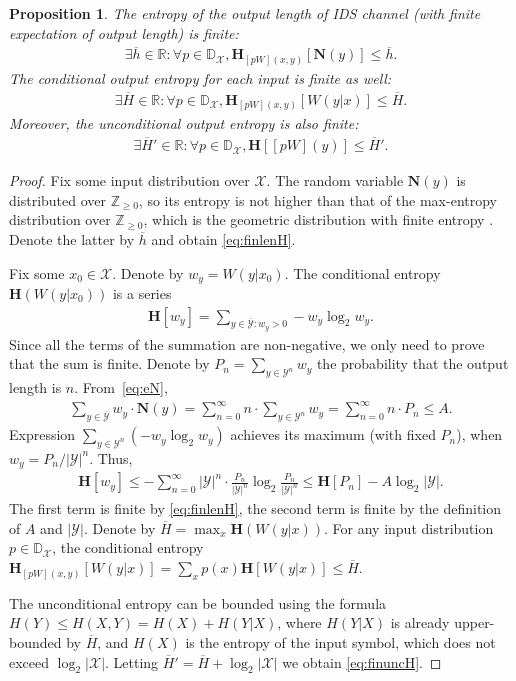 \documentclass[journal, twocol]{IEEEtran}
\newcommand{\oh}{{\overline{h}}}
\newcommand{\bD}{{\mathbb{D}}}
\newcommand{\oH}{{\overline{H}}}
\newcommand{\bfH}{{\mathbf{H}}}
\newcommand{\bfN}{{\mathbf{N}}}
\newcommand{\bR}{{\mathbb{R}}}
\newcommand{\mX}{{\mathcal{X}}}
\newcommand{\mY}{{\mathcal{Y}}}
\newcommand{\omY}{{\overline{\mathcal{Y}}}}
\newcommand{\bZ}{{\mathbb{Z}}}
\newcommand{\brsq}[1]{{\left[{#1}\right]}}
\newtheorem{proposition}{Proposition}
\newcommand{\pW}[2]{[{#1}{#2}]}
\begin{document}
\begin{proposition}%
\label{p:finH}
The entropy of the output length of IDS channel (with finite expectation of output length) is finite:
\begin{align}
\exists \oh\in\bR: \forall p\in\bD_\mX, \bfH_{[pW](x,y)}\brsq{\bfN(y)} \leq \oh.
\label{eq:finlenH}
\end{align}
The conditional output entropy for each input is finite as well:
\begin{align}
\exists \oH\in\bR: \forall p\in\bD_\mX, \bfH_{\pW{p}{W}(x,y)}\brsq{W(y|x)} \leq \oH.
\label{eq:finH}
\end{align}
Moreover, the unconditional output entropy is also finite:
\begin{align}
\exists \oH'\in\bR: \forall p\in\bD_\mX, \bfH\brsq{\pW{p}{W}(y)} \leq \oH'.
\label{eq:finuncH}
\end{align}
\end{proposition}
\begin{proof}
Fix some input distribution over $\mX$.
The random variable $\bfN(y)$ is distributed over $\bZ_{\geq 0}$, so its entropy is not higher than that of the max-entropy distribution over $\bZ_{\geq 0}$, which is the geometric distribution with finite entropy \cite{lisman72note}.
Denote the latter by $\oh$ and obtain \eqref{eq:finlenH}.

Fix some $x_0\in\mX$.
Denote by $w_y=W(y|x_0)$.
The conditional entropy $\bfH(W(y|x_0))$ is a series 
\begin{align}
\bfH\brsq{w_y}=\sum_{y\in\omY:w_y>0}-w_y\log_2w_y.
\label{eq:Elog}
\end{align}
Since all the terms of the summation are non-negative, we only need to prove that the sum is finite.
Denote by $P_n=\sum_{y\in\mY^n}w_y$ the probability that the output length is $n$.
From~\eqref{eq:eN}, 
\begin{align}
\sum_{y\in\omY}w_y\cdot\bfN(y)=\sum_{n=0}^\infty n\cdot \sum_{y\in\mY^n} w_y = \sum_{n=0}^\infty n\cdot P_n\leq A.
\label{eq:wyNyleqA}
\end{align}
Expression $\sum_{y\in\mY^n}(-w_y\log_2w_y)$ achieves its maximum (with fixed $P_n$), when $w_y=P_n/|\mY|^n$.
Thus,
\begin{align}
\bfH\brsq{w_y}
\leq -\sum_{n=0}^\infty |\mY|^n\cdot\frac{P_n}{|\mY|^n}\log_2\frac{P_n}{|\mY|^n}
\leq \bfH\brsq{P_n}-A \log_2 |\mY|.
\label{eq:p3proof}
\end{align}
The first term is finite by \eqref{eq:finlenH}, the second term is finite by the definition of $A$ and $|\mY|$. 
Denote by $\oH=\max_x \bfH(W(y|x))$.
For any input distribution $p\in\bD_\mX$, the conditional entropy $\bfH_{\pW{p}{W}(x,y)}\brsq{W(y|x)}=\sum_x p(x)\bfH\brsq{W(y|x)} \leq \oH$.

The unconditional entropy can be bounded using the formula $H(Y)\leq H(X,Y) = H(X)+H(Y|X)$, where $H(Y|X)$ is already upper-bounded by $\oH$, and $H(X)$ is the entropy of the input symbol, which does not exceed $\log_2|\mX|$. 
Letting $\oH'=\oH+\log_2|\mX|$ we obtain \eqref{eq:finuncH}.
\end{proof}
\end{document}
